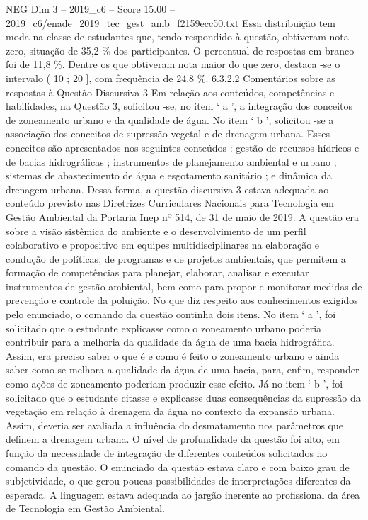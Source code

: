 \begin{textsample}{NEG Dim 3 – 2019\_c6 – Score 15.00 – 2019\_c6/enade\_2019\_tec\_gest\_amb\_f2159ecc50.txt}
Essa distribuição tem moda na classe de estudantes que, tendo respondido à questão, obtiveram nota zero, situação de 35,2 \% dos participantes.
O percentual de respostas em branco foi de 11,8 \%.
Dentre os que obtiveram nota maior do que zero, destaca -se o intervalo ( 10 ; 20 ], com frequência de 24,8 \%. 6.3.2.2 Comentários sobre as respostas à Questão Discursiva 3 Em relação aos conteúdos, competências e habilidades, na Questão 3, solicitou -se, no item ‘ a ’, a integração dos conceitos de zoneamento urbano e da qualidade de água.
No item ‘ b ’, solicitou -se a associação dos conceitos de supressão vegetal e de drenagem urbana.
Esses conceitos são apresentados nos seguintes conteúdos : gestão de recursos hídricos e de bacias hidrográficas ; instrumentos de planejamento ambiental e urbano ; sistemas de abastecimento de água e esgotamento sanitário ; e dinâmica da drenagem urbana.
Dessa forma, a questão discursiva 3 estava adequada ao conteúdo previsto nas Diretrizes Curriculares Nacionais para Tecnologia em Gestão Ambiental da Portaria Inep nº 514, de 31 de maio de 2019.
A questão era sobre a visão sistêmica do ambiente e o desenvolvimento de um perfil colaborativo e propositivo em equipes multidisciplinares na elaboração e condução de políticas, de programas e de projetos ambientais, que permitem a formação de competências para planejar, elaborar, analisar e executar instrumentos de gestão ambiental, bem como para propor e monitorar medidas de prevenção e controle da poluição.
No que diz respeito aos conhecimentos exigidos pelo enunciado, o comando da questão continha dois itens.
No item ‘ a ’, foi solicitado que o estudante explicasse como o zoneamento urbano poderia contribuir para a melhoria da qualidade da água de uma bacia hidrográfica.
Assim, era preciso saber o que é e como é feito o zoneamento urbano e ainda saber como se melhora a qualidade da água de uma bacia, para, enfim, responder como ações de zoneamento poderiam produzir esse efeito.
Já no item ‘ b ’, foi solicitado que o estudante citasse e explicasse duas consequências da supressão da vegetação em relação à drenagem da água no contexto da expansão urbana.
Assim, deveria ser avaliada a influência do desmatamento nos parâmetros que definem a drenagem urbana.
O nível de profundidade da questão foi alto, em função da necessidade de integração de diferentes conteúdos solicitados no comando da questão.
O enunciado da questão estava claro e com baixo grau de subjetividade, o que gerou poucas possibilidades de interpretações diferentes da esperada.
A linguagem estava adequada ao jargão inerente ao profissional da área de Tecnologia em Gestão Ambiental.

\end{textsample}
